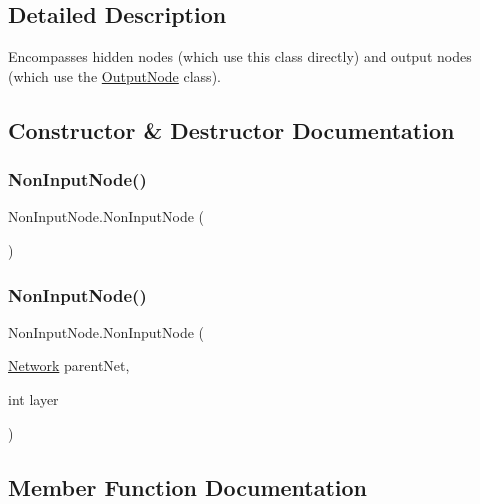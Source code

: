 \subsection{Detailed Description}
Encompasses hidden nodes (which use this class directly) and output nodes (which use the \mbox{\hyperlink{class_output_node}{Output\+Node}} class). 



\subsection{Constructor \& Destructor Documentation}
\mbox{\label{class_non_input_node_a3facbd688b6a772cf1259420238255c8}} 
\subsubsection{\texorpdfstring{Non\+Input\+Node()}{NonInputNode()}\hspace{0.1cm}{\footnotesize\ttfamily [1/2]}}
{\footnotesize\ttfamily Non\+Input\+Node.\+Non\+Input\+Node (\begin{DoxyParamCaption}{ }\end{DoxyParamCaption})}

\mbox{\label{class_non_input_node_a2805394951d04ebab266877c5723132b}} 
\subsubsection{\texorpdfstring{Non\+Input\+Node()}{NonInputNode()}\hspace{0.1cm}{\footnotesize\ttfamily [2/2]}}
{\footnotesize\ttfamily Non\+Input\+Node.\+Non\+Input\+Node (\begin{DoxyParamCaption}\item[{\mbox{\hyperlink{class_network}{Network}}}]{parent\+Net,  }\item[{int}]{layer }\end{DoxyParamCaption})}



\subsection{Member Function Documentation}
\mbox{\label{class_non_input_node_a458bad6de5c7d5e82d85998d456be3ec}} 
